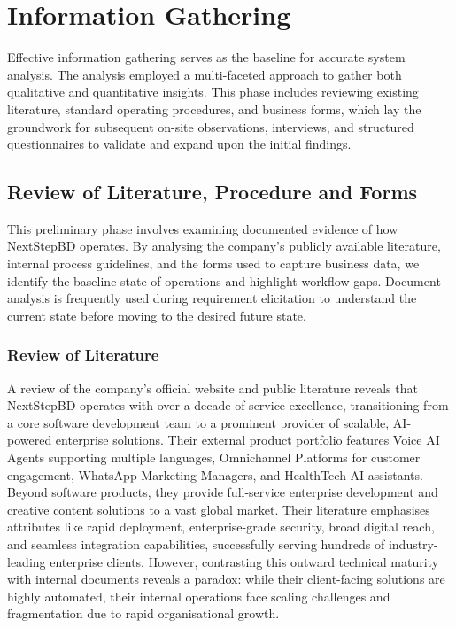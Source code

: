 \documentclass[12pt,a4paper]{report}
\begin{document}
\section{Information Gathering}
Effective information gathering serves as the baseline for accurate system analysis. The analysis employed a multi-faceted approach to gather both qualitative and quantitative insights. This phase includes reviewing existing literature, standard operating procedures, and business forms, which lay the groundwork for subsequent on-site observations, interviews, and structured questionnaires to validate and expand upon the initial findings.

\subsection{Review of Literature, Procedure and Forms}
This preliminary phase involves examining documented evidence of how NextStepBD operates. By analysing the company's publicly available literature, internal process guidelines, and the forms used to capture business data, we identify the baseline state of operations and highlight workflow gaps. Document analysis is frequently used during requirement elicitation to understand the current state before moving to the desired future state.

\subsubsection{Review of Literature}
A review of the company's official website and public literature reveals that NextStepBD operates with over a decade of service excellence, transitioning from a core software development team to a prominent provider of scalable, AI-powered enterprise solutions. Their external product portfolio features Voice AI Agents supporting multiple languages, Omnichannel Platforms for customer engagement, WhatsApp Marketing Managers, and HealthTech AI assistants. Beyond software products, they provide full-service enterprise development and creative content solutions to a vast global market. Their literature emphasises attributes like rapid deployment, enterprise-grade security, broad digital reach, and seamless integration capabilities, successfully serving hundreds of industry-leading enterprise clients. However, contrasting this outward technical maturity with internal documents reveals a paradox: while their client-facing solutions are highly automated, their internal operations face scaling challenges and fragmentation due to rapid organisational growth.
\end{document}
